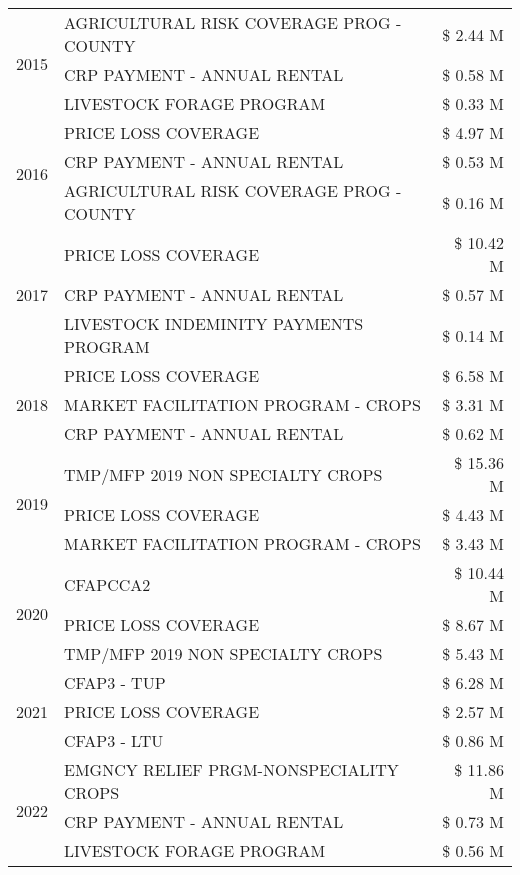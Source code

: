 \begin{tabular}{llr}
\multirow[t]{3}{*}{2015} & AGRICULTURAL RISK COVERAGE PROG - COUNTY & \$ 2.44 M \\
 & CRP PAYMENT - ANNUAL RENTAL & \$ 0.58 M \\
 & LIVESTOCK FORAGE PROGRAM & \$ 0.33 M \\
\cline{1-3}
\multirow[t]{3}{*}{2016} & PRICE LOSS COVERAGE & \$ 4.97 M \\
 & CRP PAYMENT - ANNUAL RENTAL & \$ 0.53 M \\
 & AGRICULTURAL RISK COVERAGE PROG - COUNTY & \$ 0.16 M \\
\cline{1-3}
\multirow[t]{3}{*}{2017} & PRICE LOSS COVERAGE & \$ 10.42 M \\
 & CRP PAYMENT - ANNUAL RENTAL & \$ 0.57 M \\
 & LIVESTOCK INDEMINITY PAYMENTS PROGRAM & \$ 0.14 M \\
\cline{1-3}
\multirow[t]{3}{*}{2018} & PRICE LOSS COVERAGE & \$ 6.58 M \\
 & MARKET FACILITATION PROGRAM - CROPS & \$ 3.31 M \\
 & CRP PAYMENT - ANNUAL RENTAL & \$ 0.62 M \\
\cline{1-3}
\multirow[t]{3}{*}{2019} & TMP/MFP 2019 NON SPECIALTY CROPS & \$ 15.36 M \\
 & PRICE LOSS COVERAGE & \$ 4.43 M \\
 & MARKET FACILITATION PROGRAM - CROPS & \$ 3.43 M \\
\cline{1-3}
\multirow[t]{3}{*}{2020} & CFAPCCA2 & \$ 10.44 M \\
 & PRICE LOSS COVERAGE & \$ 8.67 M \\
 & TMP/MFP 2019 NON SPECIALTY CROPS & \$ 5.43 M \\
\cline{1-3}
\multirow[t]{3}{*}{2021} & CFAP3 - TUP & \$ 6.28 M \\
 & PRICE LOSS COVERAGE & \$ 2.57 M \\
 & CFAP3 - LTU & \$ 0.86 M \\
\cline{1-3}
\multirow[t]{3}{*}{2022} & EMGNCY RELIEF PRGM-NONSPECIALITY CROPS & \$ 11.86 M \\
 & CRP PAYMENT - ANNUAL RENTAL & \$ 0.73 M \\
 & LIVESTOCK FORAGE PROGRAM & \$ 0.56 M \\
\cline{1-3}
\bottomrule
\end{tabular}
